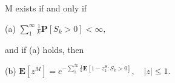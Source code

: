M exists if and only if

(a) $\sum_{1}^{\infty} \frac{1}{k} \mathbf{P}[S_k > 0] < \infty,$

and if (a) holds, then

(b) $\mathbf{E}[z^M] = e^{-\sum_{1}^{\infty} \frac{1}{k} \mathbf{E}[1 - z^S_k : S_k > 0]}, \quad |z| \leq 1.$